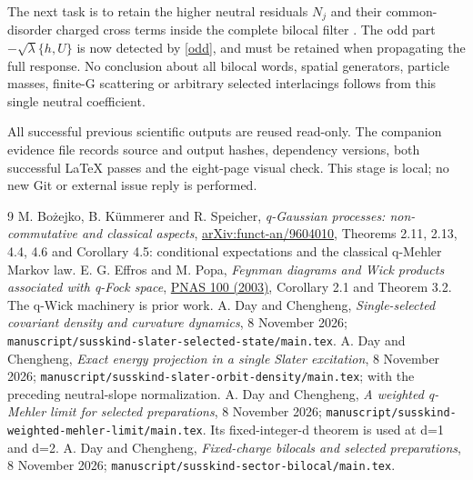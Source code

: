 \documentclass[11pt]{article}
\begin{document}
The next task is to retain the higher neutral residuals $N_j$
and their common-disorder charged cross terms inside the
complete bilocal filter \cite{bilocal}. The odd part
$-\sqrt\lambda\{h,U\}$ is now detected by \eqref{odd}, and must
be retained when propagating the full response.
No conclusion about all bilocal words, spatial generators,
particle masses, finite-G scattering or arbitrary selected
interlacings follows from this single neutral coefficient.

All successful previous scientific outputs are reused read-only.
The companion evidence file records source and output hashes,
dependency versions, both successful LaTeX passes and the
eight-page visual check. This stage is local; no new Git or
external issue reply is performed.

\begin{thebibliography}{9}\small
{} M. Bo\.zejko, B. K\"ummerer and R. Speicher,
\emph{q-Gaussian processes: non-commutative and classical aspects},
\href{https://arxiv.org/html/funct-an/9604010}{arXiv:funct-an/9604010},
Theorems 2.11, 2.13, 4.4, 4.6 and Corollary 4.5:
conditional expectations and the classical q-Mehler Markov law.
 E. G. Effros and M. Popa,
\emph{Feynman diagrams and Wick products associated with q-Fock space},
\href{https://pmc.ncbi.nlm.nih.gov/articles/PMC166362/}{PNAS 100 (2003)},
Corollary 2.1 and Theorem 3.2. The q-Wick machinery is prior work.
 A. Day and Chengheng, \emph{Single-selected
covariant density and curvature dynamics}, 8 November 2026;
\texttt{manuscript/susskind-slater-selected-state/main.tex}.
 A. Day and Chengheng, \emph{Exact energy
projection in a single Slater excitation}, 8 November 2026;
\texttt{manuscript/susskind-slater-orbit-density/main.tex};
with the preceding neutral-slope normalization.
 A. Day and Chengheng, \emph{A weighted
q-Mehler limit for selected preparations}, 8 November 2026;
\texttt{manuscript/susskind-weighted-mehler-limit/main.tex}.
Its fixed-integer-d theorem is used at d=1 and d=2.
 A. Day and Chengheng, \emph{Fixed-charge
bilocals and selected preparations}, 8 November 2026;
\texttt{manuscript/susskind-sector-bilocal/main.tex}.
\end{thebibliography}
\end{document}
